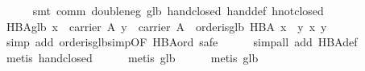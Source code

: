 \begin{isabellebody}
%
\isadelimproof
\ \ \ \ %
\endisadelimproof
%
\isatagproof
{}\isamarkupfalse%
\ {}smt\ comm\ double{}neg\ glb{}\ hand{}closed\ hand{}def\ hnot{}closed{}%
\endisatagproof
{\isafoldproof}%
%
\isadelimproof
\isanewline
%
\endisadelimproof
\isanewline
\ \ \isamarkupfalse%
\ HBA{}glb{}\ {}{}x\ {}\ carrier\ A{}\ y\ {}\ carrier\ A{}\ {}\ order{}is{}glb\ HBA\ {}x\ {}\ y{}\ {}x{}\ y{}{}\isanewline
%
\isadelimproof
\ \ \ \ %
\endisadelimproof
%
\isatagproof
{}\isamarkupfalse%
\ {}simp\ add{}\ order{}is{}glb{}simp{}OF\ HBA{}ord{}{}\ safe{}\isanewline
\ \ \ \ \isamarkupfalse%
\ {}simp{}all\ add{}\ HBA{}def{}\isanewline
\ \ \ \ \isamarkupfalse%
\ {}metis\ hand{}closed{}\isanewline
\ \ \ \ \isamarkupfalse%
\ {}metis\ glb{}{}\isanewline
\ \ \ \ \isamarkupfalse%
\ {}metis\ glb{}{}\isanewline
\ \ \ \ \isamarkupfalse%

\end{isabellebody}
